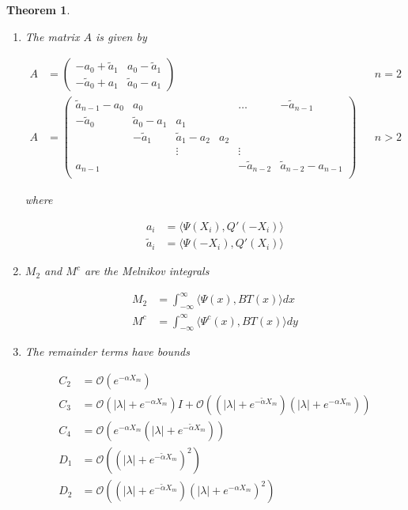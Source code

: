 \documentclass[12pt]{article}
\newtheorem{theorem}{Theorem}
\begin{document}
\begin{theorem}
\begin{enumerate}
\item The matrix $A$ is given by

\begin{align*}
A &= \begin{pmatrix}
-a_0 + \tilde{a}_1 & a_0 - \tilde{a}_1 \\
-\tilde{a}_0 + a_1 & \tilde{a}_0 - a_1
\end{pmatrix} && n = 2 \\
A &= \begin{pmatrix}
\tilde{a}_{n-1} - a_0 & a_0 & & & \dots & -\tilde{a}_{n-1}\\
-\tilde{a}_0 & \tilde{a}_0 - a_1 &  a_1 \\
& -\tilde{a}_1 & \tilde{a}_1 - a_2 &  a_2 \\
& & \vdots & & \vdots \\
a_{n-1} & & & & -\tilde{a}_{n-2} & \tilde{a}_{n-2} - a_{n-1} \\
\end{pmatrix} && n > 2
\end{align*}

where

\begin{align*}
a_i &= \langle \Psi(X_i), Q'(-X_i) \rangle \\
\tilde{a}_i &= \langle \Psi(-X_i), Q'(X_i) \rangle
\end{align*}

\item $M_2$ and $M^c$ are the Melnikov integrals

\begin{align*}
M_2 &= \int_{-\infty}^\infty \langle \Psi(x), B T(x) \rangle dx \\
M^c &= \int_{-\infty}^\infty \langle \Psi^c(x), B T(x) \rangle dy
\end{align*}

\item The remainder terms have bounds

\begin{align*}
C_2 &= \mathcal{O}(e^{-\alpha X_m}) \\
C_3 &= \mathcal{O}(|\lambda| + e^{-\alpha X_m}) I
+ \mathcal{O}((|\lambda| + e^{-\tilde{\alpha} X_m})( |\lambda| + e^{-\alpha X_m}))\\
C_4 &= \mathcal{O}(e^{-\alpha X_m}(|\lambda| + e^{-\tilde{\alpha} X_m})) \\
D_1 &= \mathcal{O}((|\lambda| + e^{-\tilde{\alpha} X_m})^2) \\
D_2 &= \mathcal{O}((|\lambda| + e^{-\tilde{\alpha} X_m})(|\lambda| + e^{-\alpha X_m})^2) 
\end{align*}


\end{enumerate}
\end{theorem}
\end{document}
